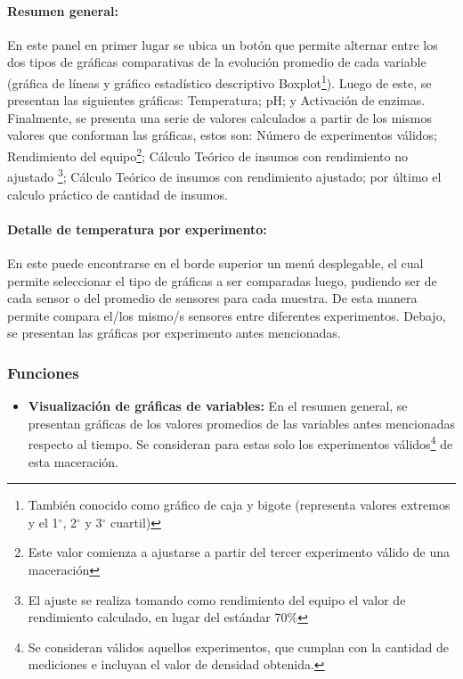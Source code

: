             \paragraph{Resumen general:} En este panel en primer lugar se ubica un botón que permite alternar entre los dos tipos de gráficas comparativas de la evolución promedio de cada variable (gráfica de líneas y gráfico estadístico descriptivo Boxplot\footnote{También conocido como gráfico de caja y bigote (representa valores extremos y el 1$^{\circ}$, 2$^{\circ}$ y 3$^{\circ}$ cuartil)}). Luego de este, se presentan las siguientes gráficas: Temperatura; pH; y Activación de enzimas. Finalmente, se presenta una serie de valores calculados a partir de los mismos valores que conforman las gráficas, estos son: Número de experimentos válidos; Rendimiento del equipo\footnote{Este valor comienza a ajustarse a partir del tercer experimento válido de una maceración}; Cálculo Teórico de insumos con rendimiento no ajustado \footnote{El ajuste se realiza tomando como rendimiento del equipo el valor de rendimiento calculado, en lugar del estándar 70\%}; Cálculo Teórico de insumos con rendimiento ajustado; por último el calculo práctico de cantidad de insumos. 
            
            \paragraph{Detalle de temperatura por experimento:} En este puede encontrarse en el borde superior un menú desplegable, el cual permite seleccionar el tipo de gráficas a ser comparadas luego, pudiendo ser de cada sensor o del promedio de sensores para cada muestra. De esta manera permite compara el/los mismo/s sensores entre diferentes experimentos. Debajo, se presentan las gráficas por experimento antes mencionadas.
            
            \subsubsection{Funciones}
            \begin{itemize}
                \item \textbf{Visualización de gráficas de variables:} En el resumen general, se presentan gráficas de los valores promedios de las variables antes mencionadas respecto al tiempo. Se consideran para estas solo los experimentos válidos\footnote{Se consideran válidos aquellos experimentos, que cumplan con la cantidad de mediciones e incluyan el valor de densidad obtenida.} de esta maceración.
            \end{itemize}
            
